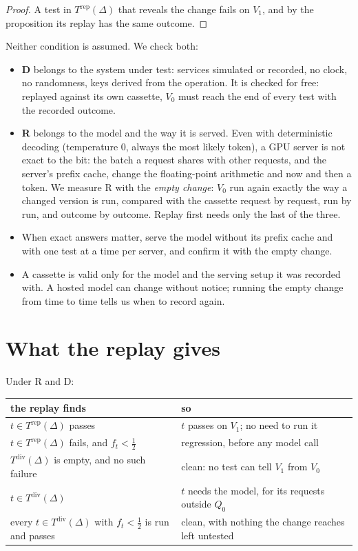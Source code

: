 \documentclass[11pt,a4paper]{article}
\newcommand{\Trep}{T^{\mathrm{rep}}(\Delta)}
\newcommand{\Tdiv}{T^{\mathrm{div}}(\Delta)}
\begin{document}
\begin{proof}
A test in $\Trep$ that reveals the change fails on $V_1$, and by the proposition its replay has the same outcome.
\end{proof}

Neither condition is assumed. We check both:
\begin{itemize}
  \item \textbf{D} belongs to the system under test: services simulated or recorded, no clock, no randomness,
        keys derived from the operation. It is checked for free: replayed against its own cassette, $V_0$ must
        reach the end of every test with the recorded outcome.
  \item \textbf{R} belongs to the model and the way it is served. Even with deterministic decoding (temperature 0,
        always the most likely token), a GPU server is not exact to the bit: the batch a request shares with other
        requests, and the server's prefix cache, change the floating-point arithmetic and now and then a token. We
        measure R with the \emph{empty change}: $V_0$ run again exactly the way a changed version is run, compared
        with the cassette request by request, run by run, and outcome by outcome. Replay first needs only the last
        of the three.
  \item When exact answers matter, serve the model without its prefix cache and with one test at a time per
        server, and confirm it with the empty change.
  \item A cassette is valid only for the model and the serving setup it was recorded with. A hosted model can
        change without notice; running the empty change from time to time tells us when to record again.
\end{itemize}

\section{What the replay gives}
\label{sec:gives}

Under R and D:

\begin{center}
\begin{tabular}{p{7.2cm}p{8.4cm}}
\toprule
the replay finds & so \\
\midrule
$t \in \Trep$ passes & $t$ passes on $V_1$; no need to run it \\
$t \in \Trep$ fails, and $f_t < \tfrac12$ & regression, before any model call \\
$\Tdiv$ is empty, and no such failure & clean: no test can tell $V_1$ from $V_0$ \\
$t \in \Tdiv$ & $t$ needs the model, for its requests outside $Q_0$ \\
every $t \in \Tdiv$ with $f_t < \tfrac12$ is run and passes & clean, with nothing the change reaches left untested
  \\
\bottomrule
\end{tabular}
\end{center}
\end{document}

